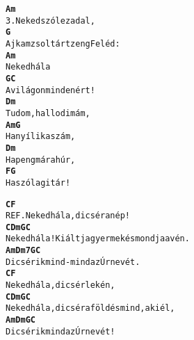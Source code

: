 \cleardoublepage
{}
\kottastart
{}
\kottaend
\begin{minipage}{\textwidth}
\begin{alltt}
\textbf{           Am}
3. Neked szól ez a dal,
\textbf{           G}
   Ajkam zsoltárt zeng Feléd:
\textbf{          Am}
   Neked hála
\textbf{      G            C}
   A világon mindenért!
\textbf{           Dm}
   Tudom, hallod imám,
\textbf{        Am       G}
   Ha nyílik a szám,
\textbf{       Dm}
   Ha peng már a húr,
\textbf{        F       G}
   Ha szól a gitár!
\end{alltt}
\vspace{0.0cm}
\versszakspacing
\end{minipage}
\begin{minipage}{\textwidth}
\begin{alltt}
\textbf{            C              F}
REF. Neked hála, dicsér a nép!
\textbf{            C              Dm        G        C}
     Neked hála! Kiáltja gyermek és mondja a vén.
\textbf{      Am       Dm7         G     C}
     Dicsérik mind-mind az Úr nevét.
\textbf{            C              F}
     Neked hála, dicsérlek én,
\textbf{            C              Dm      G        C}
     Neked hála, dicsér a föld és mind, aki él,
\textbf{      Am       Dm     G     C}
     Dicsérik mind az Úr nevét!
\end{alltt}
\vspace{0.0cm}
\versszakspacing
\end{minipage}
~\vspace{1.0cm}
\newline
